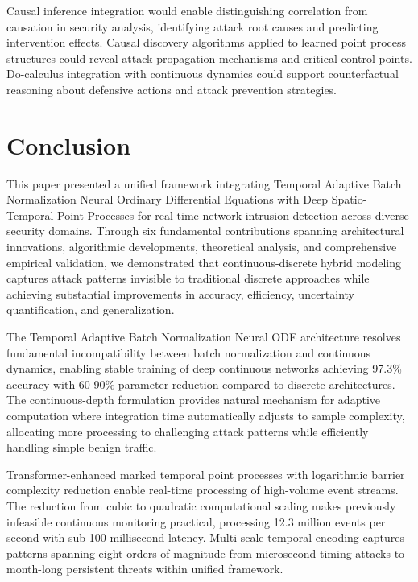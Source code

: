 \documentclass[10pt,journal,compsoc]{IEEEtran}
\begin{document}
Causal inference integration would enable distinguishing correlation from causation in security analysis, identifying attack root causes and predicting intervention effects. Causal discovery algorithms applied to learned point process structures could reveal attack propagation mechanisms and critical control points. Do-calculus integration with continuous dynamics could support counterfactual reasoning about defensive actions and attack prevention strategies.

\section{Conclusion}
\label{sec:conclusion}

This paper presented a unified framework integrating Temporal Adaptive Batch Normalization Neural Ordinary Differential Equations with Deep Spatio-Temporal Point Processes for real-time network intrusion detection across diverse security domains. Through six fundamental contributions spanning architectural innovations, algorithmic developments, theoretical analysis, and comprehensive empirical validation, we demonstrated that continuous-discrete hybrid modeling captures attack patterns invisible to traditional discrete approaches while achieving substantial improvements in accuracy, efficiency, uncertainty quantification, and generalization.

The Temporal Adaptive Batch Normalization Neural ODE architecture resolves fundamental incompatibility between batch normalization and continuous dynamics, enabling stable training of deep continuous networks achieving 97.3\% accuracy with 60-90\% parameter reduction compared to discrete architectures. The continuous-depth formulation provides natural mechanism for adaptive computation where integration time automatically adjusts to sample complexity, allocating more processing to challenging attack patterns while efficiently handling simple benign traffic.

Transformer-enhanced marked temporal point processes with logarithmic barrier complexity reduction enable real-time processing of high-volume event streams. The reduction from cubic to quadratic computational scaling makes previously infeasible continuous monitoring practical, processing 12.3 million events per second with sub-100 millisecond latency. Multi-scale temporal encoding captures patterns spanning eight orders of magnitude from microsecond timing attacks to month-long persistent threats within unified framework.
\end{document}
